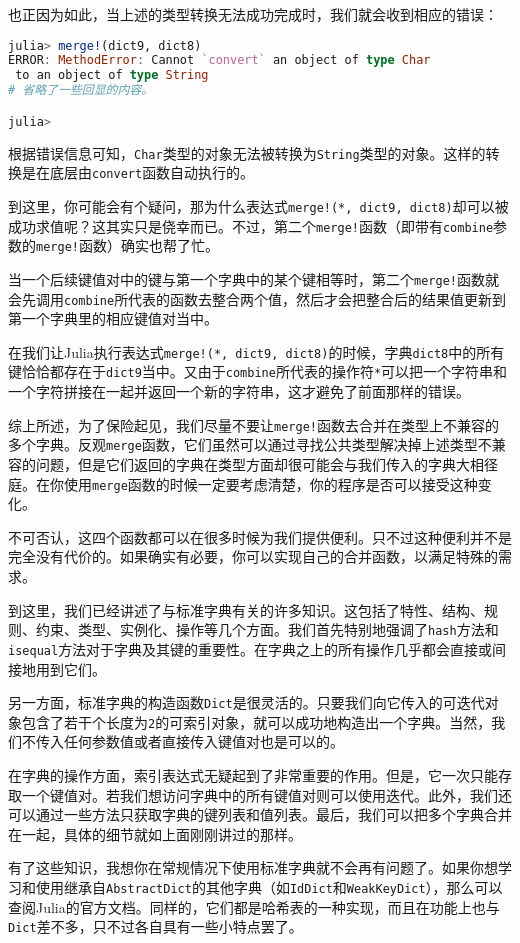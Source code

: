 也正因为如此，当上述的类型转换无法成功完成时，我们就会收到相应的错误：
\begin{lstlisting}[language=julia]
julia> merge!(dict9, dict8)
ERROR: MethodError: Cannot `convert` an object of type Char
 to an object of type String
# 省略了一些回显的内容。

julia> 
\end{lstlisting}

根据错误信息可知，\verb`Char`类型的对象无法被转换为\verb`String`类型的对象。这样的转换是在底层由\verb`convert`函数自动执行的。

到这里，你可能会有个疑问，那为什么表达式\verb`merge!(*, dict9, dict8)`却可以被成功求值呢？这其实只是侥幸而已。不过，第二个\verb`merge!`函数（即带有\verb`combine`参数的\verb`merge!`函数）确实也帮了忙。

当一个后续键值对中的键与第一个字典中的某个键相等时，第二个\verb`merge!`函数就会先调用\verb`combine`所代表的函数去整合两个值，然后才会把整合后的结果值更新到第一个字典里的相应键值对当中。

在我们让Julia执行表达式\verb`merge!(*, dict9, dict8)`的时候，字典\verb`dict8`中的所有键恰恰都存在于\verb`dict9`当中。又由于\verb`combine`所代表的操作符\verb`*`可以把一个字符串和一个字符拼接在一起并返回一个新的字符串，这才避免了前面那样的错误。

综上所述，为了保险起见，我们尽量不要让\verb`merge!`函数去合并在类型上不兼容的多个字典。反观\verb`merge`函数，它们虽然可以通过寻找公共类型解决掉上述类型不兼容的问题，但是它们返回的字典在类型方面却很可能会与我们传入的字典大相径庭。在你使用\verb`merge`函数的时候一定要考虑清楚，你的程序是否可以接受这种变化。

不可否认，这四个函数都可以在很多时候为我们提供便利。只不过这种便利并不是完全没有代价的。如果确实有必要，你可以实现自己的合并函数，以满足特殊的需求。

到这里，我们已经讲述了与标准字典有关的许多知识。这包括了特性、结构、规则、约束、类型、实例化、操作等几个方面。我们首先特别地强调了\verb`hash`方法和\verb`isequal`方法对于字典及其键的重要性。在字典之上的所有操作几乎都会直接或间接地用到它们。

另一方面，标准字典的构造函数\verb`Dict`是很灵活的。只要我们向它传入的可迭代对象包含了若干个长度为\verb`2`的可索引对象，就可以成功地构造出一个字典。当然，我们不传入任何参数值或者直接传入键值对也是可以的。

在字典的操作方面，索引表达式无疑起到了非常重要的作用。但是，它一次只能存取一个键值对。若我们想访问字典中的所有键值对则可以使用迭代。此外，我们还可以通过一些方法只获取字典的键列表和值列表。最后，我们可以把多个字典合并在一起，具体的细节就如上面刚刚讲过的那样。

有了这些知识，我想你在常规情况下使用标准字典就不会再有问题了。如果你想学习和使用继承自\verb`AbstractDict`的其他字典（如\verb`IdDict`和\verb`WeakKeyDict`），那么可以查阅Julia的官方文档。同样的，它们都是哈希表的一种实现，而且在功能上也与\verb`Dict`差不多，只不过各自具有一些小特点罢了。
